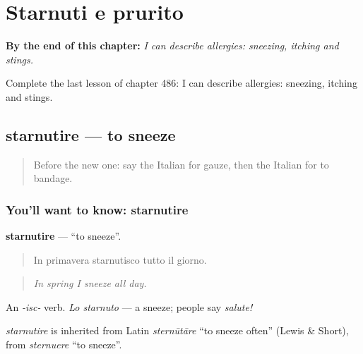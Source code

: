 
\chapter{Starnuti e prurito}
\label{ch:it-starnuti-e-prurito}

\begin{chapteropening}
\textbf{By the end of this chapter:} \emph{I can describe allergies: sneezing, itching and stings.}

Complete the last lesson of chapter 486: I can describe allergies: sneezing, itching and stings.
\end{chapteropening}

\section[starnutire]{starnutire — to sneeze}

\label{lesson:IT-C486-starnutire}



\begin{quote}
Before the new one: say the Italian for gauze, then the Italian for to bandage.
\end{quote}

\subsection*{You'll want to know: starnutire}
\textbf{starnutire} — \textquotedblleft{}to sneeze\textquotedblright{}.

\begin{quote}
In primavera starnutisco tutto il giorno.
\end{quote}

\begin{quote}
\emph{In spring I sneeze all day.}
\end{quote}

An \emph{-isc-} verb. \emph{Lo starnuto} — a sneeze; people say \emph{salute!}

\begin{cousinweb}
\emph{starnutire} is inherited from Latin \emph{sternūtāre} \textquotedblleft{}to sneeze often\textquotedblright{} (Lewis \& Short), from \emph{sternuere} \textquotedblleft{}to sneeze\textquotedblright{}.
\end{cousinweb}

